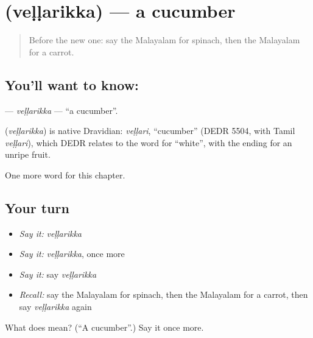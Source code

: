 \section[\texorpdfstring{\ml{വെള്ളരിക്ക} (veḷḷarikka)}{വെള്ളരിക്ക (veḷḷarikka)}]{ (veḷḷarikka) — a cucumber}

\label{lesson:ML-C323-vellarikka}



\begin{quote}
Before the new one: say the Malayalam for spinach, then the Malayalam for a carrot.
\end{quote}

\subsection*{You'll want to know: }
\textbf{} — \emph{veḷḷarikka} — \textquotedblleft{}a cucumber\textquotedblright{}.

\begin{cousinweb}
\textbf{} (\emph{veḷḷarikka}) is native Dravidian: \emph{veḷḷari}, \textquotedblleft{}cucumber\textquotedblright{} (DEDR 5504, with Tamil \emph{veḷḷari}), which DEDR relates to the word for \textquotedblleft{}white\textquotedblright{}, with the ending for an unripe fruit.
\end{cousinweb}

\begin{grammarlens}[title={What you've built}]
One more word for this chapter.
\end{grammarlens}

\subsection*{Your turn}
\begin{itemize}
\raggedright
  \item \emph{Say it:} \emph{veḷḷarikka}
  \item \emph{Say it:} \emph{veḷḷarikka}, once more
  \item \emph{Say it:} say \emph{veḷḷarikka}
  \item \emph{Recall:} say the Malayalam for spinach, then the Malayalam for a carrot, then say \emph{veḷḷarikka} again
\end{itemize}

\begin{tcolorbox}[breakable,colback=teal!4,colframe=teal!35!black,title={Before you move on}]
What does  mean? (\textquotedblleft{}A cucumber\textquotedblright{}.) Say it once more.
\end{tcolorbox}

